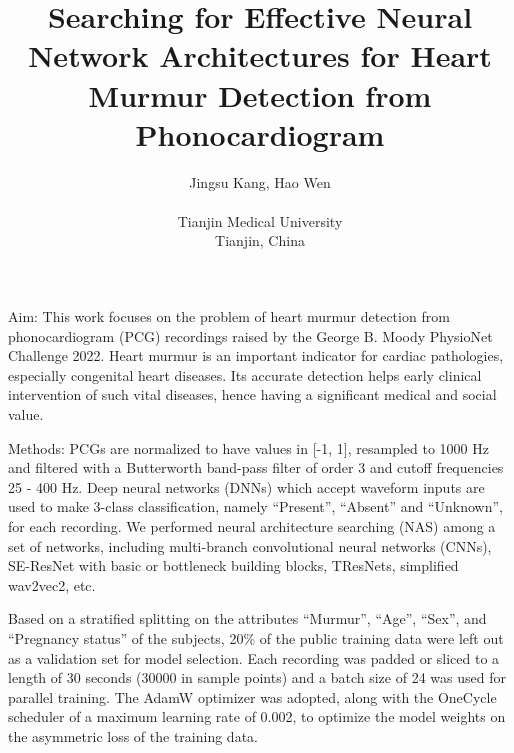 \documentclass{cinc-abstract}
\begin{document}
\title{Searching for Effective Neural Network Architectures for Heart Murmur Detection from Phonocardiogram}

\author {Jingsu Kang, Hao Wen\\ %
\ \\ %
Tianjin Medical University\\  %
Tianjin, China} %

\maketitle



Aim: This work focuses on the problem of heart murmur detection from phonocardiogram (PCG) recordings raised by the George B. Moody PhysioNet Challenge 2022. Heart murmur is an important indicator for cardiac pathologies, especially congenital heart diseases. Its accurate detection helps early clinical intervention of such vital diseases, hence having a significant medical and social value.

Methods: PCGs are normalized to have values in [-1, 1], resampled to 1000 Hz and filtered with a Butterworth band-pass filter of order 3 and cutoff frequencies 25 - 400 Hz. Deep neural networks (DNNs) which accept waveform inputs are used to make 3-class classification, namely ``Present'', ``Absent'' and ``Unknown'', for each recording. We performed neural architecture searching (NAS) among a set of networks, including multi-branch convolutional neural networks (CNNs), SE-ResNet with basic or bottleneck building blocks, TResNets, simplified wav2vec2, etc.

Based on a stratified splitting on the attributes ``Murmur'', ``Age'', ``Sex'', and ``Pregnancy status'' of the subjects, 20\% of the public training data were left out as a validation set for model selection. Each recording was padded or sliced to a length of 30 seconds (30000 in sample points) and a batch size of 24 was used for parallel training. The AdamW optimizer was adopted, along with the OneCycle scheduler of a maximum learning rate of 0.002, to optimize the model weights on the asymmetric loss of the training data.
\end{document}
